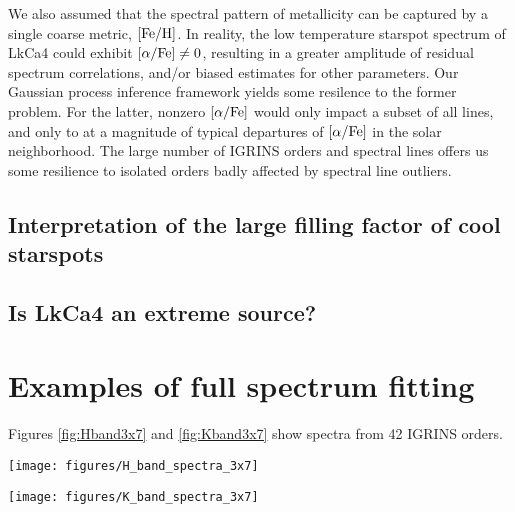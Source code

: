 \documentclass[twocolumn]{emulateapj}%
\newcommand{\name}{LkCa4 }
\begin{document}
We also assumed that the spectral pattern of metallicity can be captured by a single coarse metric, $[{\rm Fe}/{\rm H}]$.  In reality, the low temperature starspot spectrum of \name could exhibit $[\alpha/{\rm Fe}] \neq 0$, resulting in a greater amplitude of residual spectrum correlations, and/or biased estimates for other parameters.  Our Gaussian process inference framework yields some resilence to the former problem.  For the latter, nonzero $[\alpha/{\rm Fe}]$ would only impact a subset of all lines, and only to at a magnitude of typical departures of $[\alpha/{\rm Fe}]$ in the solar neighborhood.  The large number of IGRINS orders and spectral lines offers us some resilience to isolated orders badly affected by spectral line outliers.


\subsection{Interpretation of the large filling factor of cool starspots}



\subsection{Is \name an extreme source?}









\clearpage
\pagebreak


\appendix

\section{Examples of full spectrum fitting}

Figures \ref{fig:Hband3x7} and \ref{fig:Kband3x7} show spectra from 42 IGRINS orders.


\begin{figure*}
	\centering
	\texttt{[image: figures/H\_band\_spectra\_3x7]}
	\caption{IGRINS Orders 94 and $99-119$.  Note that the $y-$axis is on a logarithmic scale.  }
	\label{fig:Hband3x7}
\end{figure*}

\begin{figure*}
	\centering
	\texttt{[image: figures/K\_band\_spectra\_3x7]}
	\caption{IGRINS Orders $73-93$.  Note that the $y-$axis is on a logarithmic scale.  }
	\label{fig:Kband3x7}
\end{figure*}
\end{document}

